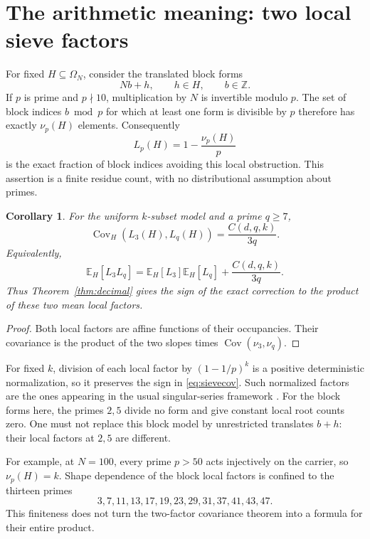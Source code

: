 \documentclass[11pt,a4paper]{article}
\newtheorem{corollary}[theorem]{Corollary}
\theoremstyle{remark}
\DeclareMathOperator{\Cov}{Cov}
\newcommand{\E}{\mathbb E}
\numberwithin{equation}{section}
\begin{document}
\section{The arithmetic meaning: two local sieve factors}\label{sec:sieve}
For fixed \(H\subseteq\Omega_N\), consider the translated block forms
\[
 Nb+h,\qquad h\in H,\qquad b\in\mathbb Z.
\]
If \(p\) is prime and \(p\nmid10\), multiplication by \(N\) is
invertible modulo \(p\).
The set of block indices \(b\bmod p\) for which at least one form
is divisible by \(p\) therefore has exactly \(\nu_p(H)\) elements.
Consequently
\begin{equation}\label{eq:localfactor}
 L_p(H)=1-\frac{\nu_p(H)}p
\end{equation}
is the exact fraction of block indices avoiding this local obstruction.
This assertion is a finite residue count, with no distributional
assumption about primes.

\begin{corollary}\label{cor:sieve}
For the uniform \(k\)-subset model and a prime \(q\ge7\),
\begin{equation}\label{eq:sievecov}
 \Cov_H(L_3(H),L_q(H))=\frac{C(d,q,k)}{3q}.
\end{equation}
Equivalently,
\[
 \E_H[L_3L_q]=\E_H[L_3]\E_H[L_q]+\frac{C(d,q,k)}{3q}.
\]
Thus Theorem~\ref{thm:decimal} gives the sign of the exact correction
to the product of these two mean local factors.
\end{corollary}
\begin{proof}
Both local factors are affine functions of their occupancies.
Their covariance is the product of the two slopes times
\(\Cov(\nu_3,\nu_q)\).
\end{proof}

For fixed \(k\), division of each local factor by
\((1-1/p)^k\) is a positive deterministic normalization, so it
preserves the sign in \eqref{eq:sievecov}. Such normalized factors
are the ones appearing in the usual singular-series framework
\cite{kuperberg}. For the block forms here, the primes \(2,5\)
divide no form and give constant local root counts zero.
One must not replace this block model by unrestricted translates
\(b+h\): their local factors at \(2,5\) are different.

For example, at \(N=100\), every prime \(p>50\) acts injectively
on the carrier, so \(\nu_p(H)=k\). Shape dependence of the block
local factors is confined to the thirteen primes
\[
 3,7,11,13,17,19,23,29,31,37,41,43,47.
\]
This finiteness does not turn the two-factor covariance theorem
into a formula for their entire product.
\end{document}

